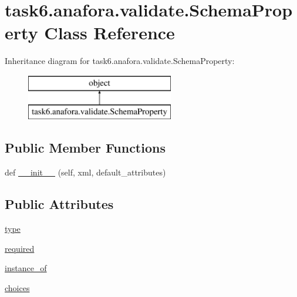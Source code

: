 \hypertarget{classtask6_1_1anafora_1_1validate_1_1SchemaProperty}{}\section{task6.\+anafora.\+validate.\+Schema\+Property Class Reference}
\label{classtask6_1_1anafora_1_1validate_1_1SchemaProperty}
Inheritance diagram for task6.\+anafora.\+validate.\+Schema\+Property\+:\begin{figure}[H]
\begin{center}
\leavevmode
\includegraphics[height=2.000000cm]{classtask6_1_1anafora_1_1validate_1_1SchemaProperty}
\end{center}
\end{figure}
\subsection*{Public Member Functions}
\begin{DoxyCompactItemize}
\item 
def \hyperlink{classtask6_1_1anafora_1_1validate_1_1SchemaProperty_a8173966ad7a91a70de53d6a7d4580000}{\+\_\+\+\_\+init\+\_\+\+\_\+} (self, xml, default\+\_\+attributes)
\end{DoxyCompactItemize}
\subsection*{Public Attributes}
\begin{DoxyCompactItemize}
\item 
\hyperlink{classtask6_1_1anafora_1_1validate_1_1SchemaProperty_a2e4df43a58524131a4a6c56f9548e875}{type}
\item 
\hyperlink{classtask6_1_1anafora_1_1validate_1_1SchemaProperty_a24417d35314f30e8abea93bd360e1ae5}{required}
\item 
\hyperlink{classtask6_1_1anafora_1_1validate_1_1SchemaProperty_a4264e9bcbc92505cea096bfa73873386}{instance\+\_\+of}
\item 
\hyperlink{classtask6_1_1anafora_1_1validate_1_1SchemaProperty_ab04ef47f9918e0b55f5cdd7b5cfddb50}{choices}
\end{DoxyCompactItemize}


